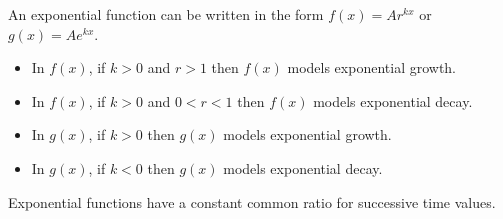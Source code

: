 % 


\begin{summary}
\item An exponential function can be written in the form $f(x) = A r^{kx}$ or $g(x) = A
    e^{kx}$.  
    \begin{itemize}
        \item In $f(x)$, if $k>0$ and $r>1$ then $f(x)$ models exponential growth.
        \item In $f(x)$, if $k>0$ and $0<r<1$ then $f(x)$ models exponential decay.
        \item In $g(x)$, if $k>0$ then $g(x)$ models exponential growth.
        \item In $g(x)$, if $k<0$ then $g(x)$ models exponential decay.
    \end{itemize}
\item Exponential functions have a constant common ratio for successive time values.
\end{summary}

\nin \hrulefill





\clearpage
